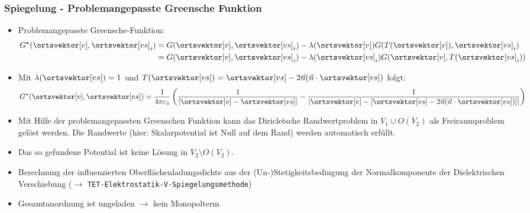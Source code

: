\begin{frame}
  \frametitle{Spiegelung - Problemangepasste Greensche Funktion}

\begin{itemize}[<+->]
\item Problemangepasste Greensche-Funktion:
      \begin{align*}
         G^\star(\ortsvektor[v],\ortsvektor[vs]_i) & = G(\ortsvektor[v],\ortsvektor[vs]_i) -\lambda(\ortsvektor[v]) G(T(\ortsvektor[v]),\ortsvektor[vs]_i)\\
         & = G(\ortsvektor[v],\ortsvektor[vs]_i) -\lambda(\ortsvektor[vs]_i) G(\ortsvektor[v],  T(\ortsvektor[vs]_i))
      \end{align*}

    \item Mit $\lambda(\ortsvektor[vs]) = 1$ und $T(\ortsvektor[vs]) = \ortsvektor[vs] - 2  \vec{n}  (\vec{n}\cdot \ortsvektor[vs])$ folgt:
      \begin{equation*}
        G^\star(\ortsvektor[v],\ortsvektor[vs]) = \frac{1}{4\pi\varepsilon_1}  \left(  \frac{1}{\left|\ortsvektor[v] -  \ortsvektor[vs] \right|}  - \frac{1}{\left|\ortsvektor[v] -  \left[ \ortsvektor[vs] - 2 \vec{n} (\vec{n}\cdot \ortsvektor[vs]) \right] \right|}\right)
      \end{equation*}
    \item Mit Hilfe der problemangepassten Greenschen Funktion kann das \alert{Diricletsche Randwertproblem} in $V_1 \cup O(V_2)$ als \alert{Freiraumproblem} gelöst werden. Die Randwerte (hier: Skalarpotential ist Null auf dem Rand) werden automatisch erfüllt.
    \item Das so gefundene Potential ist \alert{keine Lösung} in $V_2 \setminus O(V_2)$.
    \item Berechnung der influenzierten Oberflächenladungsdichte aus der (Un-)Stetigkeitsbedingung der Normalkomponente der Dielektrischen Verschiebung ($\to$ \texttt{TET-Elektrostatik-V-Spiegelungsmethode})
      \item Gesamtanordnung ist \alert{ungeladen} $\to$ kein Monopolterm
    \end{itemize}
  
\end{frame}

